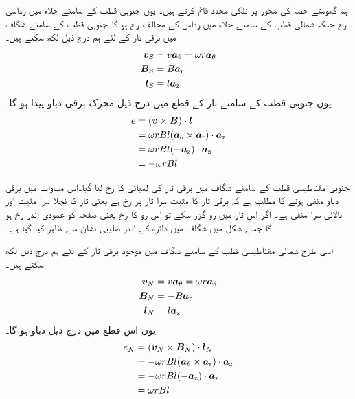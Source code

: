 ہم گھومتے حصہ کی محور پر نلکی محدد قائم کرتے ہیں۔ یوں جنوبی قطب کے سامنے خلاء میں  رداسی رخ جبکہ شمالی  قطب کے سامنے  خلاء میں   رداس کے مخالف رخ ہو گا۔جنوبی قطب کے سامنے شگاف میں برقی تار   کے لئے ہم درج ذیل لکھ سکتے ہیں۔
\begin{gather}
\begin{aligned}
{\ensuremath{{\boldsymbol{v}}}}_S&=v {\boldsymbol{a}}_{\theta} =\omega r {\boldsymbol{a}}_{\theta}\\
{{\boldsymbol{B}}}_S&=B {\boldsymbol{a}}_{\textup{r}}\\
{{\boldsymbol{l}}}_S&=l {\boldsymbol{a}}_{\textup{z}}
\end{aligned}
\end{gather}
یوں  جنوبی قطب کے سامنے تار کے قطع  میں درج ذیل محرک برقی دباو پیدا ہو گا۔
\begin{gather}
\begin{aligned}
e&=({{\boldsymbol{v}}} \times {\ensuremath{{\boldsymbol{B}}}}) \cdot {\ensuremath{{\boldsymbol{l}}}}\\
&=\omega r B l  ({\boldsymbol{a}}_{\theta} \times {\boldsymbol{a}}_{\textup{r}}) \cdot {\boldsymbol{a}}_{\textup{z}}\\
&=\omega r B l  (-{\boldsymbol{a}}_{\textup{z}}) \cdot {\boldsymbol{a}}_{\textup{z}}\\
&=-\omega r B l 
\end{aligned}
\end{gather}

جنوبی مقناطیسی قطب کے سامنے شگاف میں برقی تار کی لمبائی کا رخ  لیا گیا۔اس مساوات میں برقی دباو منفی ہونے کا مطلب ہے کہ برقی تار کا مثبت سرا تار پر  رخ ہے یعنی تار کا نچلا سرا مثبت اور بالائی سرا منفی ہے۔ اگر اس  تار میں  رو گزر سکے تو اس رو کا رخ   یعنی صفحہ کو عمودی اندر رخ ہو گا جسے  شکل  میں  شگاف میں دائرہ کے اندر صلیبی نشان سے ظاہر کیا گیا ہے۔ 

اسی طرح شمالی مقناطیسی قطب کے سامنے شگاف میں موجود برقی تار کے لئے ہم درج ذیل لکھ سکتے ہیں۔
\begin{gather}
\begin{aligned}
{\ensuremath{{\boldsymbol{v}}}}_N&=v {\boldsymbol{a}}_{\theta}=\omega r{\boldsymbol{a}}_{\theta}\\
{{\boldsymbol{B}}}_N&=-B {\boldsymbol{a}}_{\textup{r}}\\
{{\boldsymbol{l}}}_N&=l {\boldsymbol{a}}_{\textup{z}}
\end{aligned}
\end{gather}
یوں اس قطع میں درج ذیل دباو ہو گا۔
\begin{gather}
\begin{aligned}
e_N&=({{\boldsymbol{v}}}_N \times {\ensuremath{{\boldsymbol{B}}}}_N)\cdot {\ensuremath{{\boldsymbol{l}}}}_N\\
&=-\omega rB l ({\boldsymbol{a}}_{\theta} \times {\boldsymbol{a}}_{\textup{r}}) \cdot {\boldsymbol{a}}_{\textup{z}}\\
&=-\omega r B l (-{\boldsymbol{a}}_{\textup{z}}) \cdot {\boldsymbol{a}}_{\textup{z}}\\
&=\omega r B l 
\end{aligned}
\end{gather}

